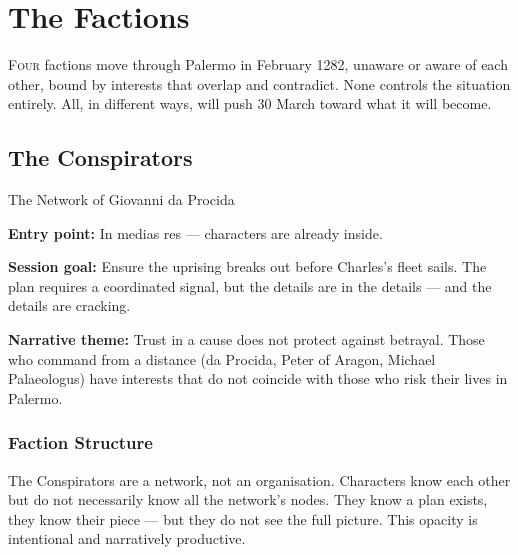 
\chapter{The Factions}

\lettrine[lines=3]{F}{our} factions move through Palermo in February
1282, unaware or aware of each other, bound by interests that overlap
and contradict. None controls the situation entirely. All, in different
ways, will push 30 March toward what it will become.


\secsep

\section{The Conspirators}
\textcolor{oro}{\cinzel\large The Network of Giovanni da Procida}

\filetto

\textbf{Entry point:} In medias res --- characters are already inside.

\textbf{Session goal:} Ensure the uprising breaks out before Charles's
fleet sails. The plan requires a coordinated signal, but the details
are in the details --- and the details are cracking.

\textbf{Narrative theme:} Trust in a cause does not protect against
betrayal. Those who command from a distance (da Procida, Peter of Aragon,
Michael Palaeologus) have interests that do not coincide with those
who risk their lives in Palermo.

\subsection{Faction Structure}

The Conspirators are a network, not an organisation. Characters know
each other but do not necessarily know all the network's nodes. They
know a plan exists, they know their piece --- but they do not see the
full picture. This opacity is intentional and narratively productive.

